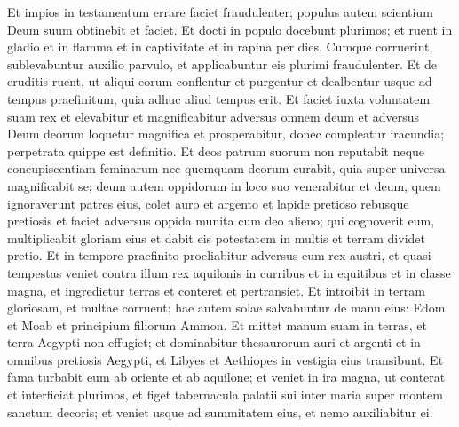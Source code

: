 \begin{biblechapter}
\begin{biblechapter}
\begin{biblechapter}
\begin{biblechapter}
\begin{biblechapter}
\begin{biblechapter}
\begin{biblechapter}
\begin{biblechapter}
\begin{biblechapter}
\begin{biblechapter}
\begin{biblechapter}
\verse Et impios in testamentum errare faciet fraudulenter; populus autem scientium Deum suum obtinebit et faciet. 
\verse Et docti in populo docebunt plurimos; et ruent in gladio et in flamma et in captivitate et in rapina per dies. 
\verse Cumque corruerint, sublevabuntur auxilio parvulo, et applicabuntur eis plurimi fraudulenter. 
\verse Et de eruditis ruent, ut aliqui eorum conflentur et purgentur et dealbentur usque ad tempus praefinitum, quia adhuc aliud tempus erit.
 \verse Et faciet iuxta voluntatem suam rex et elevabitur et magnificabitur adversus omnem deum et adversus Deum deorum loquetur magnifica et prosperabitur, donec compleatur iracundia; perpetrata quippe est definitio. 
\verse Et deos patrum suorum non reputabit neque concupiscentiam feminarum nec quemquam deorum curabit, quia super universa magnificabit se; 
\verse deum autem oppidorum in loco suo venerabitur et deum, quem ignoraverunt patres eius, colet auro et argento et lapide pretioso rebusque pretiosis 
\verse et faciet adversus oppida munita cum deo alieno; qui cognoverit eum, multiplicabit gloriam eius et dabit eis potestatem in multis et terram dividet pretio.
 \verse Et in tempore praefinito proeliabitur adversus eum rex austri, et quasi tempestas veniet contra illum rex aquilonis in curribus et in equitibus et in classe magna, et ingredietur terras et conteret et pertransiet. 
\verse Et introibit in terram gloriosam, et multae corruent; hae autem solae salvabuntur de manu eius: Edom et Moab et principium filiorum Ammon. 
\verse Et mittet manum suam in terras, et terra Aegypti non effugiet; 
\verse et dominabitur thesaurorum auri et argenti et in omnibus pretiosis Aegypti, et Libyes et Aethiopes in vestigia eius transibunt. 
\verse Et fama turbabit eum ab oriente et ab aquilone; et veniet in ira magna, ut conterat et interficiat plurimos, 
\verse et figet tabernacula palatii sui inter maria super montem sanctum decoris; et veniet usque ad summitatem eius, et nemo auxiliabitur ei.
 

\end{biblechapter}
\end{biblechapter}
\end{biblechapter}
\end{biblechapter}
\end{biblechapter}
\end{biblechapter}
\end{biblechapter}
\end{biblechapter}
\end{biblechapter}
\end{biblechapter}
\end{biblechapter}
